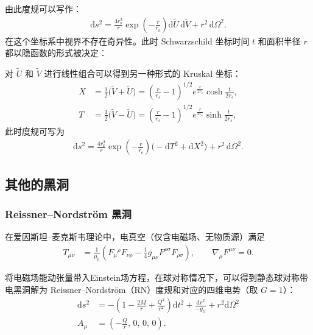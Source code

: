 由此度规可以写作：
\begin{align}
    \mathrm{d}s^{2}
    = \frac{4r_{\mathrm{s}}^{3}}{r}\exp\!\left(-\frac{r}{r_{\mathrm{s}}}\right)
      \mathrm{d}\widetilde{U}\,\mathrm{d}\widetilde{V}
      + r^{2}\,\mathrm{d}\Omega^{2}.
\end{align}
在这个坐标系中视界不存在奇异性。此时 Schwarzschild 坐标时间 $t$ 和面积半径 $r$ 都以隐函数的形式被决定：

对 $\widetilde{U}$ 和 $\widetilde{V}$ 进行线性组合可以得到另一种形式的 Kruskal 坐标：
\begin{align}
    X &= \frac{1}{2}\bigl(\widetilde{V} + \widetilde{U}\bigr) = \left(\frac{r}{r_s}-1\right)^{1/2}e^{\frac{r}{2r_s}}\cosh{\frac{t}{2r_s}},\\
    T &= \frac{1}{2}\bigl(\widetilde{V} - \widetilde{U}\bigr) = \left(\frac{r}{r_s}-1\right)^{1/2}e^{\frac{r}{2r_s}}\sinh{\frac{t}{2r_s}},
    \label{eq:XTandrs}
\end{align}
此时度规可写为
\begin{align}
    \mathrm{d}s^{2}
    = \frac{4 r_{\mathrm{s}}^{3}}{r}\exp\!\left(-\frac{r}{r_{\mathrm{s}}}\right)
      \bigl(-\mathrm{d}T^{2}+\mathrm{d}X^{2}\bigr)
      + r^{2}\,\mathrm{d}\Omega^{2}.
\end{align}

\subsection{其他的黑洞}
\subsubsection{Reissner--Nordstr\"om 黑洞}

在爱因斯坦--麦克斯韦理论中，电真空（仅含电磁场、无物质源）满足
\begin{align}
T_{\mu\nu}
&=
\frac{1}{\mu_{0}}
\left(
F_{\mu}{}^{\rho}F_{\nu\rho}
-\frac{1}{4}g_{\mu\nu}F^{\rho\sigma}F_{\rho\sigma}
\right),
\qquad
\nabla_{\mu}F^{\mu\nu}=0 .
\end{align}

将电磁场能动张量带入Einstein场方程，在球对称情况下，可以得到静态球对称带电黑洞解为 Reissner--Nordstr\"om（RN）度规和对应的四维电势（取 $G=1$）：
\begin{align}
\mathrm{d}s^{2}
&=
-\left(1-\frac{2M}{r}+\frac{Q^{2}}{r^{2}}\right)\mathrm{d}t^{2}
+\frac{\mathrm{d}r^{2}}{-g_{tt}}
+r^{2}\mathrm{d}\Omega^{2} \\
A_{\mu}&=\left(-\frac{Q}{r},\,0,\,0,\,0\right).
\end{align}

